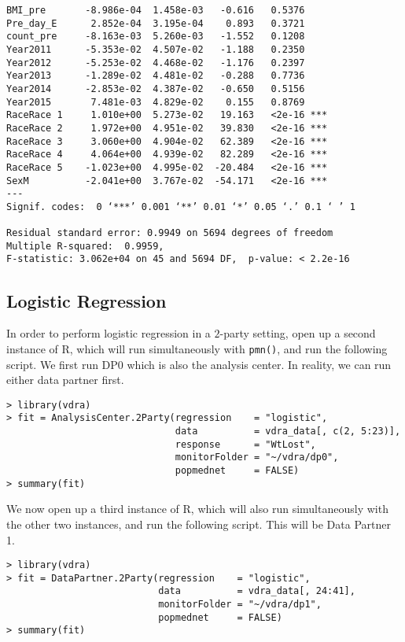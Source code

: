 \documentclass[12]{article}
\begin{document}
\begin{verbatim}
BMI_pre       -8.986e-04  1.458e-03   -0.616   0.5376    
Pre_day_E      2.852e-04  3.195e-04    0.893   0.3721    
count_pre     -8.163e-03  5.260e-03   -1.552   0.1208    
Year2011      -5.353e-02  4.507e-02   -1.188   0.2350    
Year2012      -5.253e-02  4.468e-02   -1.176   0.2397    
Year2013      -1.289e-02  4.481e-02   -0.288   0.7736    
Year2014      -2.853e-02  4.387e-02   -0.650   0.5156    
Year2015       7.481e-03  4.829e-02    0.155   0.8769    
RaceRace 1     1.010e+00  5.273e-02   19.163   <2e-16 ***
RaceRace 2     1.972e+00  4.951e-02   39.830   <2e-16 ***
RaceRace 3     3.060e+00  4.904e-02   62.389   <2e-16 ***
RaceRace 4     4.064e+00  4.939e-02   82.289   <2e-16 ***
RaceRace 5    -1.023e+00  4.995e-02  -20.484   <2e-16 ***
SexM          -2.041e+00  3.767e-02  -54.171   <2e-16 ***
---
Signif. codes:  0 ‘***’ 0.001 ‘**’ 0.01 ‘*’ 0.05 ‘.’ 0.1 ‘ ’ 1

Residual standard error: 0.9949 on 5694 degrees of freedom
Multiple R-squared:  0.9959,
F-statistic: 3.062e+04 on 45 and 5694 DF,  p-value: < 2.2e-16
\end{verbatim}



\subsection{Logistic Regression}

In order to perform logistic regression in a $2$-party setting, open up a second instance of R, which will run simultaneously with \verb"pmn()", and run the following script.  We first run DP0 which is also the analysis center.  In reality, we can run either data partner first.

\begin{verbatim}
> library(vdra)
> fit = AnalysisCenter.2Party(regression    = "logistic",
                              data          = vdra_data[, c(2, 5:23)],
                              response      = "WtLost",
                              monitorFolder = "~/vdra/dp0",
                              popmednet     = FALSE)
> summary(fit)
\end{verbatim}

We now open up a third instance of R, which will also run simultaneously with the other two instances, and run the following script.  This will be Data Partner 1.

\begin{verbatim}
> library(vdra)
> fit = DataPartner.2Party(regression    = "logistic",
                           data          = vdra_data[, 24:41],
                           monitorFolder = "~/vdra/dp1",
                           popmednet     = FALSE)
> summary(fit)
\end{verbatim}
\end{document}

